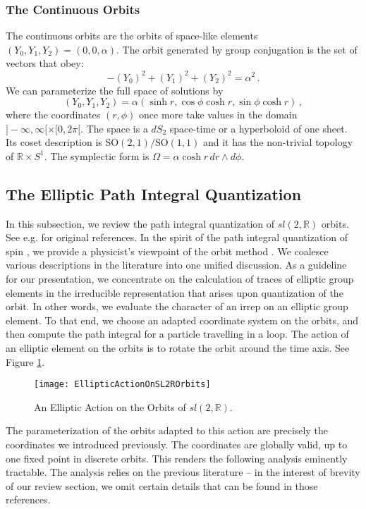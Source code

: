 \documentclass[12pt]{article}
\numberwithin{equation}{section}
\numberwithin{equation}{section}
\numberwithin{table}{section}\setlength{\multlinegap}{25pt}
\begin{document}
\subsubsection{The Continuous Orbits}
The continuous orbits are the orbits of space-like elements $(Y_0,Y_1,Y_2)=(0,0,\alpha)$.  The orbit generated by group conjugation is the set of vectors that obey:
\begin{equation}
-(Y_0)^2 + (Y_1)^2 + (Y_2)^2 = \alpha^2 \, .
\end{equation}
We can parameterize the full space of solutions by 
\begin{equation}
(Y_0,Y_1,Y_2) = \alpha (\sinh r, \cos \phi \cosh r, \sin \phi \cosh r)
\, ,
\end{equation}
where the coordinates $(r,\phi)$ once more take  values in the domain $]-\infty,\infty[ \times [0,2 \pi[$. 
The space is a  $dS_2$ space-time or a hyperboloid of one sheet. Its coset description is SO$(2,1)/\mathrm{SO}(1,1)$ and it has the non-trivial topology of $\mathbb{R} \times S^1$. The symplectic form is $\Omega=\alpha \cosh r \, dr \wedge d \phi$. 

\subsection{The Elliptic Path Integral Quantization}
\label{ellipticquant}
In this subsection, we review the path integral quantization of $sl(2,\mathbb{R})$ orbits. See e.g.  \cite{Vergne,Witten:1987ty} for original references. In the spirit of the path integral quantization of spin \cite{Nielsen:1987sa,Johnson:1988qm,Alekseev:1988vx}, we provide a physicist's viewpoint of the orbit method \cite{Kirillov}. We coalesce various  descriptions in the literature  into one unified discussion. As a guideline for our presentation, we concentrate on the calculation of  traces of elliptic group elements in the irreducible representation that arises upon quantization of the orbit. In other words, we evaluate the character of an irrep on an elliptic group element. To that end, we choose an adapted coordinate system on the orbits, and then compute the path integral for a particle travelling in a loop. 
The action of an elliptic element on the orbits is to rotate the orbit around the time axis. See Figure \ref{EllipticActionOnSL2ROrbits}. 
\begin{figure}
\begin{center}
\texttt{[image: EllipticActionOnSL2ROrbits]}
\end{center}
\caption{An Elliptic Action on the Orbits of $sl(2,\mathbb{R})$.}
\label{EllipticActionOnSL2ROrbits}
\end{figure}
The parameterization of the orbits adapted to this action are precisely the coordinates we introduced previously. The coordinates are globally valid, up to one fixed point in discrete orbits. This renders the following analysis eminently tractable. 
The analysis  relies on the previous literature
\cite{Nielsen:1987sa,Johnson:1988qm,Alekseev:1988vx,Troost:2003ge,Troost:2012ck} -- in the interest of brevity of our review section, we omit  certain details that can be found in those references. 
\end{document}
